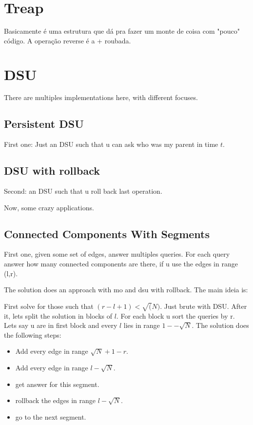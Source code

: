     \section{Treap}
    \tab Basicamente é uma estrutura que dá pra fazer um monte de coisa com "pouco"  código. A operação reverse é a + roubada.
    
    

    \section{DSU}
    \tab There are multiples implementations here, with different focuses.

    \subsection{Persistent DSU}
    \tab First one: Just an DSU such that u can ask who was my parent in time $t$.
    

    
    \subsection{DSU with rollback}
    \tab Second: an DSU such that u roll back last operation.
    

    \tab Now, some crazy applications.
    \subsection{Connected Components With Segments}
    
    \tab First one, given some set of edges, answer multiples queries. For each query answer how many connected components are there, if u use the edges in range (l,r).

    The solution does an approach with mo and dsu with rollback. The main ideia is:

    First solve for those such that $(r-l+1) < \sqrt(N)$. Just brute with DSU.
    After it, lets split the solution in blocks of $l$. 
    For each block u sort the queries by r. Lets say u are in first block and every $l$ lies in range $1--\sqrt{N}$.
    The solution does the following steps:
    \begin{itemize}
        \item Add every edge in range $\sqrt{N}+1-r$.
        \item Add every edge in range $l-\sqrt{N}$.
        \item get answer for this segment.
        \item rollback the edges in range $l-\sqrt{N}$.
        \item go to the next segment.
    \end{itemize}

